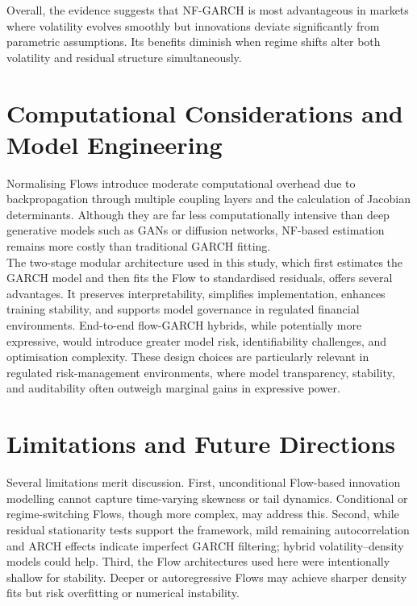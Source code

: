 \documentclass[oneside,12pt]{CUEDthesisPSnPDF}
\begin{document}
Overall, the evidence suggests that NF-GARCH is most advantageous in markets where volatility evolves smoothly but innovations deviate significantly from parametric assumptions. Its benefits diminish when regime shifts alter both volatility and residual structure simultaneously.\\

\section{Computational Considerations and Model Engineering}

\noindent
Normalising Flows introduce moderate computational overhead due to backpropagation through multiple coupling layers and the calculation of Jacobian determinants. Although they are far less computationally intensive than deep generative models such as GANs or diffusion networks, NF-based estimation remains more costly than traditional GARCH fitting.\\

The two-stage modular architecture used in this study, which first estimates the GARCH model and then fits the Flow to standardised residuals, offers several advantages. It preserves interpretability, simplifies implementation, enhances training stability, and supports model governance in regulated financial environments. End-to-end flow-GARCH hybrids, while potentially more expressive, would introduce greater model risk, identifiability challenges, and optimisation complexity. These design choices are particularly relevant in regulated risk-management environments, where model transparency, stability, and auditability often outweigh marginal gains in expressive power.\\


\section{Limitations and Future Directions}

\noindent
Several limitations merit discussion. First, unconditional Flow-based innovation modelling cannot capture time-varying skewness or tail dynamics. Conditional or regime-switching Flows, though more complex, may address this. Second, while residual stationarity tests support the framework, mild remaining autocorrelation and ARCH effects indicate imperfect GARCH filtering; hybrid volatility–density models could help. Third, the Flow architectures used here were intentionally shallow for stability. Deeper or autoregressive Flows may achieve sharper density fits but risk overfitting or numerical instability.\\
\end{document}

